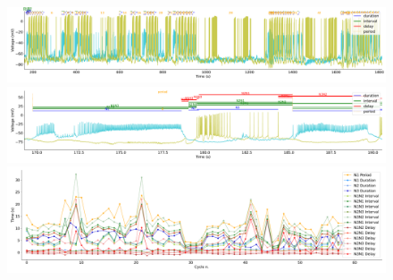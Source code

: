 \begin{figure}[htbp]
	\centering
	\begin{minipage}[b]{\textwidth}
		\centering
		\includegraphics[width=\textwidth,height=0.1\textheight]{./invariants/data/SUSSEX/prep3/images/prep3_3phases_signal_intervals_zoom.pdf}
		\includegraphics[width=\textwidth]{./invariants/data/SUSSEX/prep3/images/prep3_3phases_signal_intervals_cycle.pdf}
		\includegraphics[width=\textwidth]{./invariants/data/SUSSEX/prep3/images/prep3_3phases_time_cycle.pdf}
	\end{minipage}
	\centering
	\begin{minipage}{0.9\textwidth}
		\begin{minipage}[b]{0.45\textwidth}
			\centering

\end{minipage}
\end{minipage}
\end{figure}
